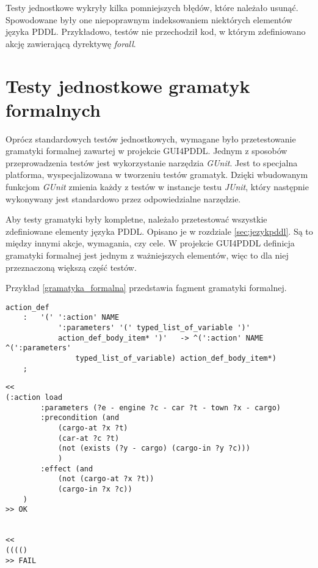 Testy jednostkowe wykryły kilka pomniejszych błędów, które należało usunąć. Spowodowane były one niepoprawnym indeksowaniem niektórych elementów języka PDDL. Przykładowo, testów nie przechodził kod, w którym zdefiniowano akcję zawierającą dyrektywę \textit{forall}.
\section{Testy jednostkowe gramatyk formalnych}
Oprócz standardowych testów jednostkowych, wymagane było przetestowanie gramatyki formalnej zawartej w projekcie GUI4PDDL. Jednym z sposobów przeprowadzenia testów jest wykorzystanie narzędzia \textit{GUnit}. Jest to specjalna platforma, wyspecjalizowana w tworzeniu testów gramatyk. Dzięki wbudowanym funkcjom \textit{GUnit} zmienia każdy z testów w instancje testu \textit{JUnit}, który następnie wykonywany jest standardowo przez odpowiedzialne narzędzie.

Aby testy gramatyki były kompletne, należało przetestować wszystkie zdefiniowane elementy języka PDDL. Opisano je w rozdziale \ref{sec:jezykpddl}. Są to między innymi akcje, wymagania, czy cele. W projekcie GUI4PDDL definicja gramatyki formalnej jest jednym z ważniejszych elementów, więc to dla niej przeznaczoną większą część testów.

Przykład \ref{gramatyka_formalna} przedstawia fagment gramatyki formalnej.


\begin{Code}
\begin{lstlisting}[language=LISP,frame=single,label={gramatyka_formalna}, caption={Fragment gramatyki formalnej}]
action_def 
	:	'(' ':action' NAME
			':parameters' '(' typed_list_of_variable ')'
			action_def_body_item* ')'   -> ^(':action' NAME ^(':parameters' 
				typed_list_of_variable)	action_def_body_item*) 
	;
\end{lstlisting}
\end{Code}

\begin{Code}
\begin{lstlisting}[language=LISP,frame=single,label={test_gramatyki}, caption={Przykładowe testy dla przykładu \ref{gramatyka_formalna}}]
<<
(:action load
        :parameters (?e - engine ?c - car ?t - town ?x - cargo)
        :precondition (and
            (cargo-at ?x ?t)
            (car-at ?c ?t)
            (not (exists (?y - cargo) (cargo-in ?y ?c)))
            )
        :effect (and
            (not (cargo-at ?x ?t))
            (cargo-in ?x ?c))
    )
>> OK


<<
(((()
>> FAIL
\end{lstlisting}
\end{Code}

